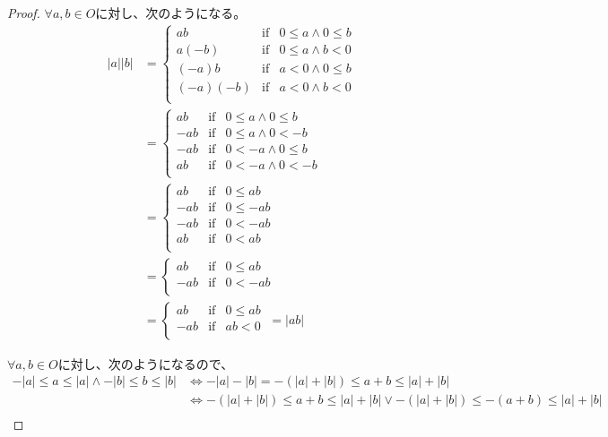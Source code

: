 \documentclass[dvipdfmx]{jsarticle}
\begin{document}
\begin{proof}
$\forall a,b \in O$に対し、次のようになる。
\begin{align*}
|a||b| &= \left\{ \begin{matrix}
ab & \mathrm{if} & 0 \leq a \land 0 \leq b \\
a( - b) & \mathrm{if} & 0 \leq a \land b < 0 \\
( - a)b & \mathrm{if} & a < 0 \land 0 \leq b \\
( - a)( - b) & \mathrm{if} & a < 0 \land b < 0 \\
\end{matrix} \right.\ \\ 
&= \left\{ \begin{matrix}
ab & \mathrm{if} & 0 \leq a \land 0 \leq b \\
 - ab & \mathrm{if} & 0 \leq a \land 0 < - b \\
 - ab & \mathrm{if} & 0 < - a \land 0 \leq b \\
ab & \mathrm{if} & 0 < - a \land 0 < - b \\
\end{matrix} \right.\ \\ 
&= \left\{ \begin{matrix}
ab & \mathrm{if} & 0 \leq ab \\
 - ab & \mathrm{if} & 0 \leq - ab \\
 - ab & \mathrm{if} & 0 < - ab \\
ab & \mathrm{if} & 0 < ab \\
\end{matrix} \right.\ \\ 
&= \left\{ \begin{matrix}
ab & \mathrm{if} & 0 \leq ab \\
 - ab & \mathrm{if} & 0 < - ab \\
\end{matrix} \right.\ \\ 
&= \left\{ \begin{matrix}
ab & \mathrm{if} & 0 \leq ab \\
 - ab & \mathrm{if} & ab < 0 \\
\end{matrix} \right.\  = |ab|
\end{align*}\par
$\forall a,b \in O$に対し、次のようになるので、
\begin{align*}
- |a| \leq a \leq |a| \land - |b| \leq b \leq |b| &\Leftrightarrow - |a| - |b| = - \left( |a| + |b| \right) \leq a + b \leq |a| + |b|\\ 
&\Leftrightarrow - \left( |a| + |b| \right) \leq a + b \leq |a| + |b| \vee - \left( |a| + |b| \right) \leq - (a + b) \leq |a| + |b|\\ 

\end{align*}
\end{proof}
\end{document}
